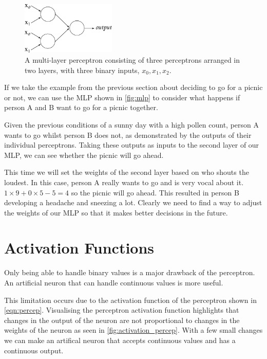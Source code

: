 \begin{figure}
	\centering
	\includegraphics[width=0.4\textwidth]{Figs/intro2dl/mlp.png}
	
	\caption{A multi-layer perceptron consisting of three perceptrons arranged in two layers, with three binary inputs, $x_0, x_1, x_2$.}
	\label{fig:mlp}
\end{figure}

If we take the example from the previous section about deciding to go for a picnic or not, we can use the MLP shown in \autoref{fig:mlp} to consider what happens if person A and B want to go for a picnic together.

Given the previous conditions of a sunny day with a high pollen count, person A wants to go whilst person B does not, as demonstrated by the outputs of their individual perceptrons. Taking these outputs as inputs to the second layer of our MLP, we can see whether the picnic will go ahead.

This time we will set the weights of the second layer based on who shouts the loudest. In this case, person A really wants to go and is very vocal about it. $1 \times 9 + 0 \times 5 - 5 = 4$ so the picnic will go ahead. This resulted in person B developing a headache and sneezing a lot. Clearly we need to find a way to adjust the weights of our MLP so that it makes better decisions in the future.

\section{Activation Functions}

Only being able to handle binary values is a major drawback of the perceptron. An artificial neuron that can handle continuous values is more useful.

This limitation occurs due to the activation function of the perceptron shown in \autoref{eqn:percep}. Visualising the perceptron activation function highlights that changes in the output of the neuron are not proportional to changes in the weights of the neuron as seen in \autoref{fig:activation_percep}. With a few small changes we can make an artifical neuron that accepts continuous values and has a continuous output.

